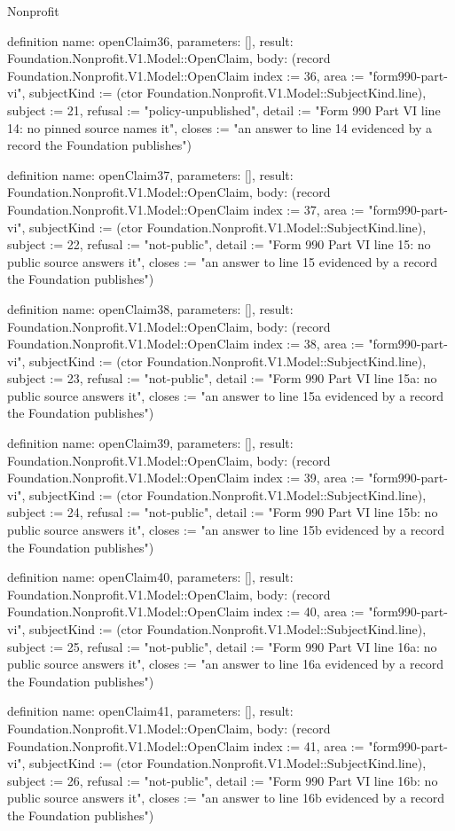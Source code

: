 \begin{lexlean}{Nonprofit}
\begin{semanticmodule}
definition{
  name: openClaim36,
  parameters: [],
  result: Foundation.Nonprofit.V1.Model::OpenClaim,
  body: (record Foundation.Nonprofit.V1.Model::OpenClaim {index := 36, area := "form990-part-vi", subjectKind := (ctor Foundation.Nonprofit.V1.Model::SubjectKind.line), subject := 21, refusal := "policy-unpublished", detail := "Form 990 Part VI line 14: no pinned source names it", closes := "an answer to line 14 evidenced by a record the Foundation publishes"})
}

definition{
  name: openClaim37,
  parameters: [],
  result: Foundation.Nonprofit.V1.Model::OpenClaim,
  body: (record Foundation.Nonprofit.V1.Model::OpenClaim {index := 37, area := "form990-part-vi", subjectKind := (ctor Foundation.Nonprofit.V1.Model::SubjectKind.line), subject := 22, refusal := "not-public", detail := "Form 990 Part VI line 15: no public source answers it", closes := "an answer to line 15 evidenced by a record the Foundation publishes"})
}

definition{
  name: openClaim38,
  parameters: [],
  result: Foundation.Nonprofit.V1.Model::OpenClaim,
  body: (record Foundation.Nonprofit.V1.Model::OpenClaim {index := 38, area := "form990-part-vi", subjectKind := (ctor Foundation.Nonprofit.V1.Model::SubjectKind.line), subject := 23, refusal := "not-public", detail := "Form 990 Part VI line 15a: no public source answers it", closes := "an answer to line 15a evidenced by a record the Foundation publishes"})
}

definition{
  name: openClaim39,
  parameters: [],
  result: Foundation.Nonprofit.V1.Model::OpenClaim,
  body: (record Foundation.Nonprofit.V1.Model::OpenClaim {index := 39, area := "form990-part-vi", subjectKind := (ctor Foundation.Nonprofit.V1.Model::SubjectKind.line), subject := 24, refusal := "not-public", detail := "Form 990 Part VI line 15b: no public source answers it", closes := "an answer to line 15b evidenced by a record the Foundation publishes"})
}

definition{
  name: openClaim40,
  parameters: [],
  result: Foundation.Nonprofit.V1.Model::OpenClaim,
  body: (record Foundation.Nonprofit.V1.Model::OpenClaim {index := 40, area := "form990-part-vi", subjectKind := (ctor Foundation.Nonprofit.V1.Model::SubjectKind.line), subject := 25, refusal := "not-public", detail := "Form 990 Part VI line 16a: no public source answers it", closes := "an answer to line 16a evidenced by a record the Foundation publishes"})
}

definition{
  name: openClaim41,
  parameters: [],
  result: Foundation.Nonprofit.V1.Model::OpenClaim,
  body: (record Foundation.Nonprofit.V1.Model::OpenClaim {index := 41, area := "form990-part-vi", subjectKind := (ctor Foundation.Nonprofit.V1.Model::SubjectKind.line), subject := 26, refusal := "not-public", detail := "Form 990 Part VI line 16b: no public source answers it", closes := "an answer to line 16b evidenced by a record the Foundation publishes"})
}


\end{semanticmodule}
\end{lexlean}
